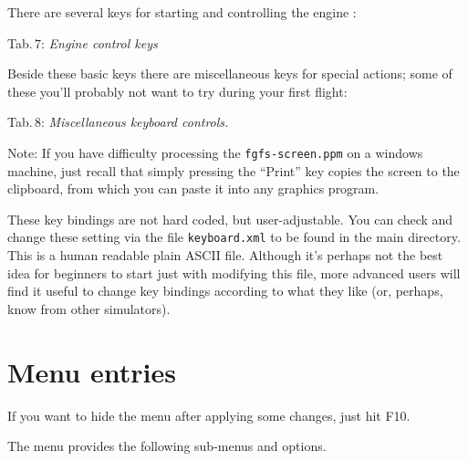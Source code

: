 \centerline{}
\medskip

There are several keys for starting and controlling the engine :

\noindent
 Tab.\,7: \textit{Engine control keys}
\medskip

\centerline{}
\medskip

Beside these basic keys there are miscellaneous keys for special
actions; some of these you'll probably not want to try during your
first flight:
\vfill
\eject

\noindent Tab.\,8: \textit{Miscellaneous keyboard controls.}
\medskip

\centerline{}
\medskip

\noindent
 Note: If you have difficulty processing the 
\texttt{fgfs-screen.ppm}
on a windows machine, just recall that simply pressing the ``Print'' key copies
the
screen to the clipboard, from which you can paste it into any graphics program.

These key bindings are not hard coded, but
user-adjustable.
You can check and change these setting via the file
\texttt{keyboard.xml} to be found in the main
\FlightGear{} directory. This is a human readable plain ASCII file.
Although it's perhaps not the best idea for beginners to start just
with modifying this file, more advanced users will find it useful to
change key bindings according to what they like (or, perhaps, know from
other simulators).

\section{Menu entries}

If you want to hide the menu after applying some changes, just hit F10.

The menu provides the following sub-menus and options.

